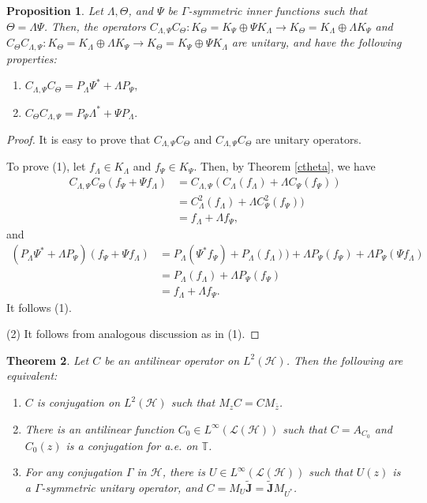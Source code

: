 \documentclass[12pt]{amsart}
\numberwithin{equation}{section}
\newcommand{\hsp}{\mathcal{H}}
\newcommand{\oL }{\mathcal{L}(\hsp) }
\newcommand{\J}{{\mathbf{J}}}
\newtheorem{theorem}{Theorem}[section]
\newtheorem{proposition}[theorem]{Proposition}
\theoremstyle{definition}
\numberwithin{equation}{section}
\begin{document}
\begin{proposition}
Let $\Lambda,\Theta$, and $\Psi$ be $\Gamma$-symmetric inner functions such that $\Theta=\Lambda\Psi$. Then, the operators $C_{\Lambda,\Psi}C_{\Theta}:K_{\Theta}=K_{\Psi}\oplus\Psi K_{\Lambda}\to K_{\Theta}=K_{\Lambda}\oplus \Lambda K_{\Psi}$ and
$C_{\Theta}C_{\Lambda,\Psi}:K_{\Theta}=K_{\Lambda}\oplus\Lambda K_{\Psi}\to K_{\Theta}=K_{\Psi}\oplus \Psi K_{\Lambda}$ are unitary, and have the following properties:
\begin{enumerate}[(1)]
    \item $C_{\Lambda,\Psi}C_{\Theta}=P_{\Lambda}\Psi^{*}+\Lambda P_{\Psi},$
    \item $C_{\Theta}C_{\Lambda,\Psi}=P_{\Psi}\Lambda^{*}+\Psi P_{\Lambda}.$
\end{enumerate}
\end{proposition}
\begin{proof}
It is easy to prove that $C_{\Lambda,\Psi}C_{\Theta}$ and $C_{\Lambda,\Psi}C_{\Theta}$ are unitary operators.

To prove (1), let $f_{\Lambda}\in K_{\Lambda}$ and $f_{\Psi}\in K_{\Psi}$. Then, by Theorem \ref{ctheta}, we have
\begin{align*}
C_{\Lambda,\Psi}C_{\Theta}(f_{\Psi}+\Psi f_{\Lambda})
&=C_{\Lambda,\Psi}(C_{\Lambda}(f_{\Lambda})+\Lambda C_{\Psi} (f_{\Psi}))\\
&=C^{2}_{\Lambda}(f_{\Lambda})+\Lambda C^{2}_{\Psi} (f_{\Psi}))\\
&=f_{\Lambda}+\Lambda f_{\Psi},
\end{align*}
and
\begin{align*}
(P_{\Lambda}\Psi^{*}+\Lambda P_{\Psi})(f_{\Psi}+\Psi f_{\Lambda})
&=P_{\Lambda} (\Psi^{*}f_{\Psi})+P_{\Lambda} (f_{\Lambda}))+\Lambda P_{\Psi}(f_{\Psi})+\Lambda P_{\Psi}(\Psi f_{\Lambda})\\
&=P_{\Lambda}(f_{\Lambda})+\Lambda P_{\Psi}(f_{\Psi})\\
&=f_{\Lambda}+\Lambda f_{\Psi}.
\end{align*}
It follows (1).

(2) It follows from analogous discussion as in (1).

\end{proof}

\medskip

\begin{theorem}\cite[Theorem 4.8]{CKLP}\label{mzconj}
Let $C$ be an antilinear operator on $L^{2}(\hsp)$. Then the following are equivalent:
\begin{enumerate}[(1)]
    \item $C$ is conjugation on $L^{2}({\hsp})$ such that $M_{z}C=CM_{\bar z}$.
    \item  There is an antilinear function $C_{0}\in L^{\infty}({\oL})$ such that $C=A_{C_{0}}$ and $C_{0}(z)$ is a conjugation for a.e. on $\mathbb{T}$.
        \item For any conjugation $\Gamma$ in $\hsp$, there is $U\in L^{\infty}(\oL)$ such that $U(z)$ is a $\Gamma$-symmetric unitary operator, and $C=M_{U}\widetilde{\J}=\widetilde{\J}M_{U^{*}}$.
\end{enumerate}
\end{theorem}
\end{document}
